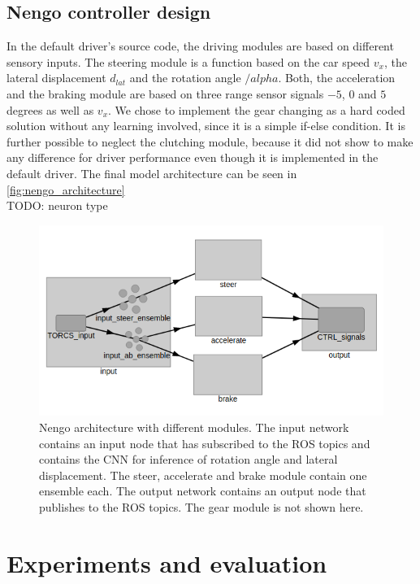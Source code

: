 \documentclass[10pt,a4paper,twoside,journal]{IEEEtran}
\begin{document}
\subsection{Nengo controller design}
In the default driver's source code, the driving modules are based on different sensory inputs. The steering module is a function based on the car speed $v_x$, the lateral displacement $d_{lat}$ and the rotation angle $/alpha$. Both, the acceleration and the braking module are based on three range sensor signals $-5$, $0$ and $5$ degrees as well as $v_x$. We chose to implement the gear changing as a hard coded solution without any learning involved, since it is a simple if-else condition. It is further possible to neglect the clutching module, because it did not show to make any difference for driver performance even though it is implemented in the default driver. The final model architecture can be seen in \autoref{fig:nengo_architecture}\\
TODO: neuron type
\begin{figure}[ht]
	\centering
	\includegraphics[width=\columnwidth]{attachments/nengo_architecture.png}
	\caption{Nengo architecture with different modules. The input network contains an input node that has subscribed to the ROS topics and contains the CNN for inference of rotation angle and lateral displacement. The steer, accelerate and brake module contain one ensemble each. The output network contains an output node that publishes to the ROS topics. The gear module is not shown here.}
	\label{fig:nengo_architecture}
\end{figure}



\section{Experiments and evaluation}
\label{sc:evaluation}
\end{document}
